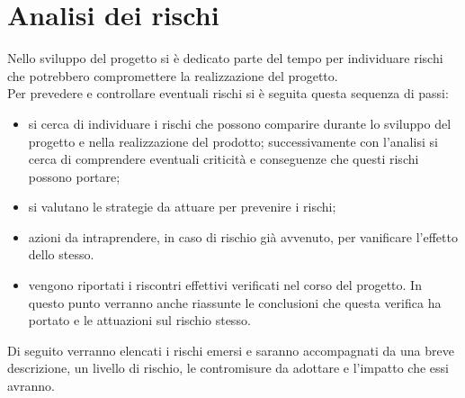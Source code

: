 \section{Analisi dei rischi}
Nello sviluppo del progetto si è dedicato parte del tempo per individuare rischi che potrebbero compromettere la realizzazione del progetto.\\
Per prevedere e controllare eventuali rischi si è seguita questa sequenza di passi:
\begin{itemize}
\item {} si cerca di individuare i rischi che possono comparire durante lo sviluppo del progetto e nella realizzazione del prodotto; successivamente con l'analisi si cerca di comprendere eventuali criticità e conseguenze che questi rischi possono portare;
\item {} si valutano le strategie da attuare  per prevenire i rischi;
\item {} azioni da intraprendere, in caso di rischio già avvenuto, per vanificare l'effetto dello stesso.
\item {} vengono riportati i riscontri effettivi verificati nel corso del progetto. In questo punto verranno anche riassunte le conclusioni che questa verifica ha portato e le attuazioni sul rischio stesso. 
\end{itemize}
Di seguito verranno elencati i rischi emersi e saranno accompagnati da una breve descrizione, un livello di rischio, le contromisure da adottare e l'impatto che essi avranno.

